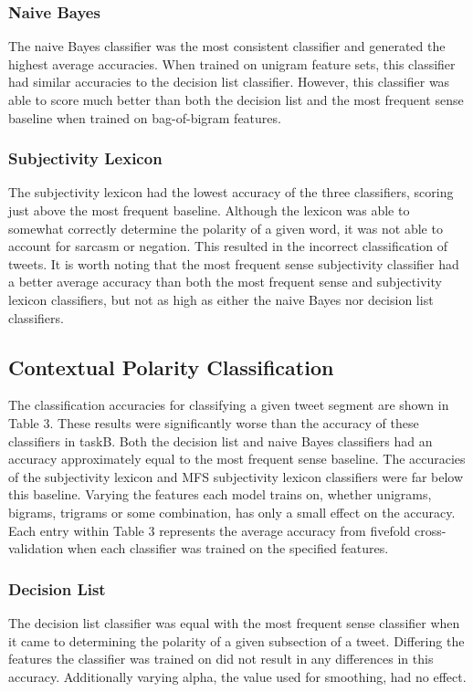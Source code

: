 \documentclass[11pt]{article}
\begin{document}
\subsubsection*{Naive Bayes}
The naive Bayes classifier was the most consistent classifier and generated the highest average accuracies. When trained on unigram feature sets, this classifier had similar accuracies to the decision list classifier. However, this classifier was able to score much better than both the decision list and the most frequent sense baseline when trained on bag-of-bigram features.

\subsubsection*{Subjectivity Lexicon}
The subjectivity lexicon had the lowest accuracy of the three classifiers, scoring just above the most frequent baseline. Although the lexicon was able to somewhat correctly determine the polarity of a given word, it was not able to account for sarcasm or negation. This resulted in the incorrect classification of tweets. It is worth noting that the most frequent sense subjectivity classifier had a better average accuracy than both the most frequent sense and subjectivity lexicon classifiers, but not as high as either the naive Bayes nor decision list classifiers. 

\subsection{Contextual Polarity Classification}
The classification accuracies for classifying a given tweet segment are shown in Table 3. These results were significantly worse than the accuracy of these classifiers in taskB. Both the decision list and naive Bayes classifiers had an accuracy approximately equal to the most frequent sense baseline. The accuracies of the subjectivity lexicon and MFS subjectivity lexicon classifiers were far below this baseline. Varying the features each model trains on, whether unigrams, bigrams, trigrams or some combination, has only a small effect on the accuracy. Each entry within Table 3 represents the average accuracy from fivefold cross-validation when each classifier was trained on the specified features. 

\subsubsection{Decision List}
The decision list classifier was equal with the most frequent sense classifier when it came to determining the polarity of a given subsection of a tweet. Differing the features the classifier was trained on did not result in any differences in this accuracy. Additionally varying alpha, the value used for smoothing, had no effect.  
\end{document}
